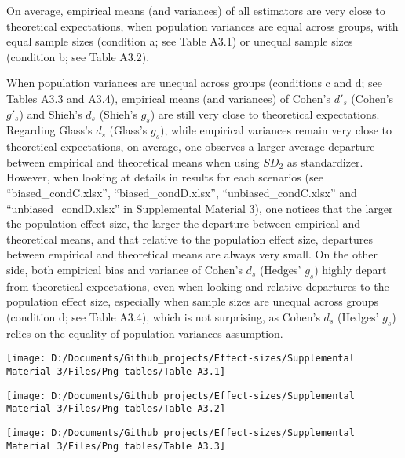 \documentclass[
  man]{apa6}
\begin{document}
On average, empirical means (and variances) of all estimators are very close to theoretical expectations, when population variances are equal across groups, with equal sample sizes (condition a; see Table A3.1) or unequal sample sizes (condition b; see Table A3.2).

When population variances are unequal across groups (conditions c and d; see Tables A3.3 and A3.4), empirical means (and variances) of Cohen's \(d'_s\) (Cohen's \(g'_s\)) and Shieh's \(d_s\) (Shieh's \(g_s\)) are still very close to theoretical expectations. Regarding Glass's \(d_s\) (Glass's \(g_s\)), while empirical variances remain very close to theoretical expectations, on average, one observes a larger average departure between empirical and theoretical means when using \(SD_2\) as standardizer. However, when looking at details in results for each scenarios (see \enquote{biased\_condC.xlsx}, \enquote{biased\_condD.xlsx}, \enquote{unbiased\_condC.xlsx} and \enquote{unbiased\_condD.xlsx} in Supplemental Material 3), one notices that the larger the population effect size, the larger the departure between empirical and theoretical means, and that relative to the population effect size, departures between empirical and theoretical means are always very small. On the other side, both empirical bias and variance of Cohen's \(d_s\) (Hedges' \(g_s\)) highly depart from theoretical expectations, even when looking and relative departures to the population effect size, especially when sample sizes are unequal across groups (condition d; see Table A3.4), which is not surprising, as Cohen's \(d_s\) (Hedges' \(g_s\)) relies on the equality of population variances assumption.

\begin{sidewaysfigure}

{\centering \texttt{[image: D:/Documents/Github\_projects/Effect-sizes/Supplemental Material 3/Files/Png tables/Table A3.1]} 

}

\end{sidewaysfigure}

\begin{sidewaysfigure}

{\centering \texttt{[image: D:/Documents/Github\_projects/Effect-sizes/Supplemental Material 3/Files/Png tables/Table A3.2]} 

}

\end{sidewaysfigure}

\begin{sidewaysfigure}

{\centering \texttt{[image: D:/Documents/Github\_projects/Effect-sizes/Supplemental Material 3/Files/Png tables/Table A3.3]} 

}

\end{sidewaysfigure}
\end{document}
